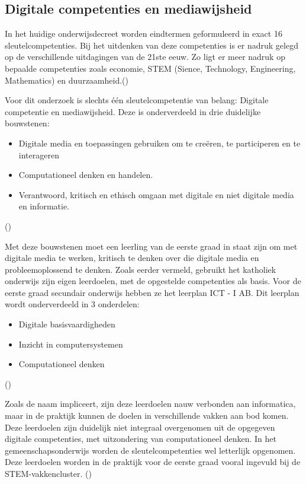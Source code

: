 \subsection{Digitale competenties en mediawijsheid} 
In het huidige onderwijsdecreet worden eindtermen geformuleerd in exact 16 sleutelcompetenties. Bij het uitdenken van deze competenties is er nadruk gelegd op de verschillende uitdagingen van de 21ste eeuw. Zo ligt er meer nadruk op bepaalde competenties zoals economie, STEM (Sience, Technology, Engineering, Mathematics) en duurzaamheid.(\cite{Vlaanderen2018b})

Voor dit onderzoek is slechts één sleutelcompetentie van belang: Digitale competentie en mediawijsheid. Deze is onderverdeeld in drie duidelijke bouwstenen:
\begin{itemize}
    \item Digitale media en toepassingen gebruiken om te creëren, te participeren en te interageren
    \item Computationeel denken en handelen.
    \item Verantwoord, kritisch en ethisch omgaan met digitale en niet digitale media en informatie.
\end{itemize}
(\cite{Vlaanderen2018a})

Met deze bouwstenen moet een leerling van de eerste graad in staat zijn om met digitale media te werken, kritisch te denken over die digitale media en probleemoplossend te denken. 
Zoals eerder vermeld, gebruikt het katholiek onderwijs zijn eigen leerdoelen, met de opgestelde competenties als basis. Voor de eerste graad secundair onderwijs hebben ze het leerplan ICT - I AB. Dit leerplan wordt onderverdeeld in 3 onderdelen:
\begin{itemize}
    \item Digitale basisvaardigheden
    \item Inzicht in computersystemen
    \item Computationeel denken
\end{itemize}(\cite{Llinkid2019})

Zoals de naam impliceert, zijn deze leerdoelen nauw verbonden aan informatica, maar in de praktijk kunnen de doelen in verschillende vakken aan bod komen. Deze leerdoelen zijn duidelijk niet integraal overgenomen uit de opgegeven digitale competenties, met uitzondering van computationeel denken.
In het gemeenschapsonderwijs worden de sleutelcompetenties wel letterlijk opgenomen. Deze leerdoelen worden in de praktijk voor de eerste graad vooral ingevuld bij de STEM-vakkencluster. (\cite{Smartschool})

